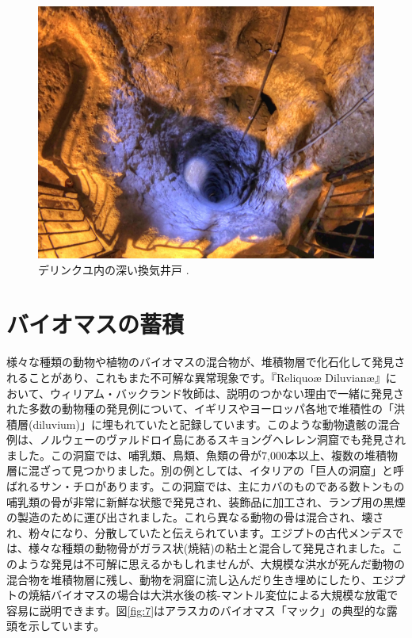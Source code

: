 \documentclass[10pt,twocolumn,letterpaper]{article}
\begin{document}
\begin{figure}[t]
\begin{center}
   \includegraphics[width=1\linewidth]{derinkuyu-air.jpg}
\end{center}
   \caption{デリンクユ内の深い換気井戸 \cite{53}.}
\label{fig:6}
\label{fig:onecol}
\end{figure}


\section{バイオマスの蓄積}

様々な種類の動物や植物のバイオマスの混合物が、堆積物層で化石化して発見されることがあり、これもまた不可解な異常現象です。『Reliquoæ Diluvianæ』において、ウィリアム・バックランド牧師は、説明のつかない理由で一緒に発見された多数の動物種の発見例について、イギリスやヨーロッパ各地で堆積性の「洪積層(diluvium)」に埋もれていたと記録しています\cite{58}。このような動物遺骸の混合例は、ノルウェーのヴァルドロイ島にあるスキョングヘレレン洞窟でも発見されました。この洞窟では、哺乳類、鳥類、魚類の骨が7,000本以上、複数の堆積物層に混ざって見つかりました\cite{59}。別の例としては、イタリアの「巨人の洞窟」と呼ばれるサン・チロがあります。この洞窟では、主にカバのものである数トンもの哺乳類の骨が非常に新鮮な状態で発見され、装飾品に加工され、ランプ用の黒煙の製造のために運び出されました。これら異なる動物の骨は混合され、壊され、粉々になり、分散していたと伝えられています\cite{60,61}。エジプトの古代メンデスでは、様々な種類の動物骨がガラス状(焼結)の粘土と混合して発見されました\cite{57}。このような発見は不可解に思えるかもしれませんが、大規模な洪水が死んだ動物の混合物を堆積物層に残し、動物を洞窟に流し込んだり生き埋めにしたり、エジプトの焼結バイオマスの場合は大洪水後の核-マントル変位による大規模な放電で容易に説明できます。図\ref{fig:7}はアラスカのバイオマス「マック」の典型的な露頭を示しています\cite{56}。
\end{document}
